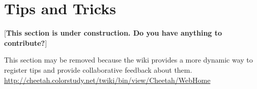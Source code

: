 \section{Tips and Tricks}
\label{tips}

[{\bf This section is under construction.  Do you have anything to contribute?}]

This section may be removed because the wiki provides a more dynamic way to
register tips and provide collaborative feedback about them.
\url{http://cheetah.colorstudy.net/twiki/bin/view/Cheetah/WebHome}



